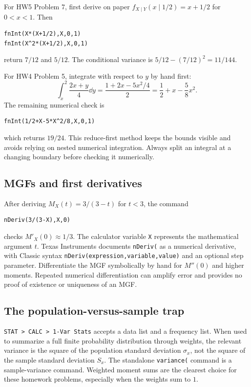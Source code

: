For HW5 Problem 7, first derive on paper
$f_{X\mid Y}(x\mid1/2)=x+1/2$ for $0<x<1$. Then
\begin{verbatim}
fnInt(X*(X+1/2),X,0,1)
fnInt(X^2*(X+1/2),X,0,1)
\end{verbatim}
return $7/12$ and $5/12$. The conditional variance is $5/12-(7/12)^2=11/144$.

For HW4 Problem 5, integrate with respect to $y$ by hand first:
\[
\int_x^2\frac{2x+y}{4}\dd y
=\frac{1+2x-5x^2/4}{2}
=\frac12+x-\frac58x^2.
\]
The remaining numerical check is
\begin{verbatim}
fnInt(1/2+X-5*X^2/8,X,0,1)
\end{verbatim}
which returns $19/24$. This reduce-first method keeps the bounds visible and avoids relying on nested numerical integration. Always split an integral at a changing boundary before checking it numerically.

\subsection{MGFs and first derivatives}
After deriving $M_X(t)=3/(3-t)$ for $t<3$, the command
\begin{verbatim}
nDeriv(3/(3-X),X,0)
\end{verbatim}
checks $M'_X(0)\approx1/3$. The calculator variable \texttt{X} represents the mathematical argument $t$. Texas Instruments documents \texttt{nDeriv(} as a numerical derivative, with Classic syntax \texttt{nDeriv(expression,variable,value)} and an optional step parameter. Differentiate the MGF symbolically by hand for $M''(0)$ and higher moments. Repeated numerical differentiation can amplify error and provides no proof of existence or uniqueness of an MGF.

\subsection{The population-versus-sample trap}
\texttt{STAT > CALC > 1-Var Stats} accepts a data list and a frequency list. When used to summarize a full finite probability distribution through weights, the relevant variance is the square of the population standard deviation $\sigma_x$, not the square of the sample standard deviation $S_x$. The standalone \texttt{variance(} command is a sample-variance command. Weighted moment sums are the clearest choice for these homework problems, especially when the weights sum to $1$.

